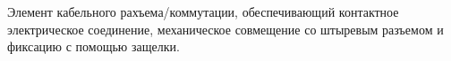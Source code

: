 Элемент кабельного рахъема/коммутации, обеспечивающий контактное электрическое соединение,
механическое совмещение со штыревым разъемом и фиксацию с помощью защелки.